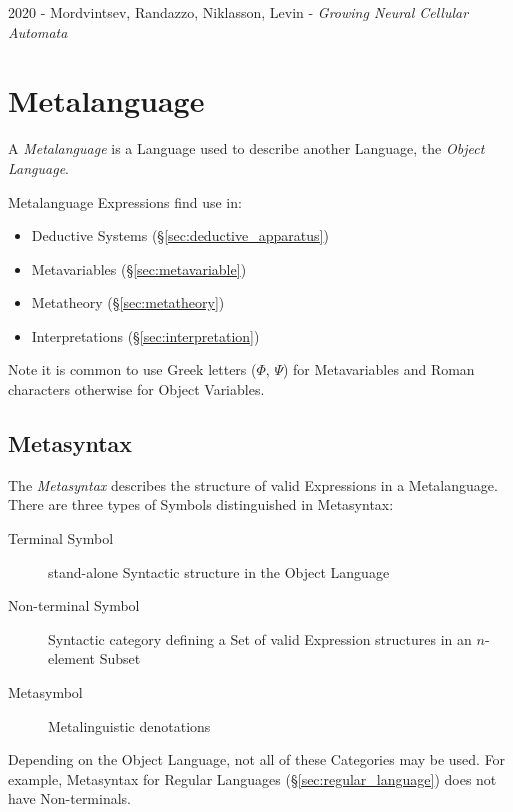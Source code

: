 2020 - Mordvintsev, Randazzo, Niklasson, Levin - \emph{Growing Neural Cellular
  Automata}



\section{Metalanguage}\label{sec:metalanguage}

A \emph{Metalanguage} is a Language used to describe another Language,
the \emph{Object Language}.

Metalanguage Expressions find use in:
\begin{itemize}
  \item Deductive Systems (\S\ref{sec:deductive_apparatus})
  \item Metavariables (\S\ref{sec:metavariable})
  \item Metatheory (\S\ref{sec:metatheory})
  \item Interpretations (\S\ref{sec:interpretation})
\end{itemize}

Note it is common to use Greek letters ($\Phi$, $\Psi$) for
Metavariables and Roman characters otherwise for Object Variables.



\subsection{Metasyntax}\label{sec:metasyntax}

The \emph{Metasyntax} describes the structure of valid Expressions in
a Metalanguage. There are three types of Symbols distinguished in
Metasyntax:
\begin{description}
  \item [Terminal Symbol] stand-alone Syntactic structure in the
    Object Language
  \item [Non-terminal Symbol] Syntactic category defining a Set of
    valid Expression structures in an $n$-element Subset
  \item [Metasymbol] Metalinguistic denotations
\end{description}
Depending on the Object Language, not all of these Categories may be
used. For example, Metasyntax for Regular Languages
(\S\ref{sec:regular_language}) does not have Non-terminals.




